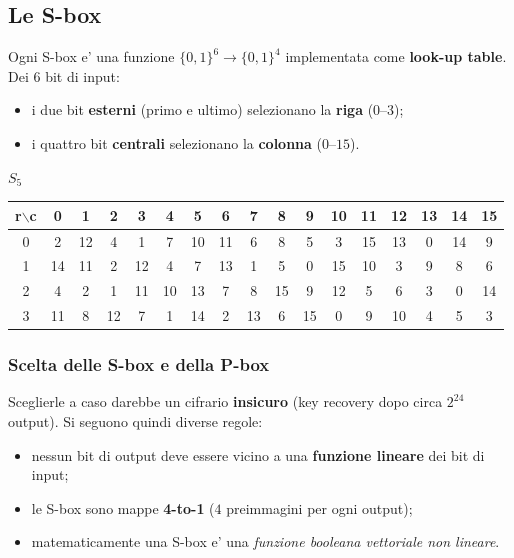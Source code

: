\subsection{Le S-box}
Ogni S-box e' una funzione $ \{0,1\}^6 \to \{0,1\}^4 $ implementata come \textbf{look-up table}. Dei $ 6 $ bit di input:
\begin{itemize}
  \item i due bit \textbf{esterni} (primo e ultimo) selezionano la \textbf{riga} ($ 0 $--$ 3 $);
  \item i quattro bit \textbf{centrali} selezionano la \textbf{colonna} ($ 0 $--$ 15 $).
\end{itemize}
\begin{center}
  \footnotesize
  \textbf{$S_5$}\\[2pt]
  \begin{tabular}{|c|*{16}{c|}}
    \hline
    \textbf{r$\backslash$c} & 0 & 1 & 2 & 3 & 4 & 5 & 6 & 7 & 8 & 9 & 10 & 11 & 12 & 13 & 14 & 15 \\ \hline
    0 & 2 & 12 & 4 & 1 & 7 & 10 & 11 & 6 & 8 & 5 & 3 & 15 & 13 & 0 & 14 & 9 \\ \hline
    1 & 14 & 11 & 2 & 12 & 4 & 7 & 13 & 1 & 5 & 0 & 15 & 10 & 3 & 9 & 8 & 6 \\ \hline
    2 & 4 & 2 & 1 & 11 & 10 & 13 & 7 & 8 & 15 & 9 & 12 & 5 & 6 & 3 & 0 & 14 \\ \hline
    3 & 11 & 8 & 12 & 7 & 1 & 14 & 2 & 13 & 6 & 15 & 0 & 9 & 10 & 4 & 5 & 3 \\ \hline
  \end{tabular}
\end{center}

\subsubsection{Scelta delle S-box e della P-box}
Sceglierle a caso darebbe un cifrario \textbf{insicuro} (key recovery dopo circa $ 2^{24} $ output). Si seguono quindi diverse regole:
\begin{itemize}
  \item nessun bit di output deve essere vicino a una \textbf{funzione lineare} dei bit di input;
  \item le S-box sono mappe \textbf{4-to-1} ($ 4 $ preimmagini per ogni output);
  \item matematicamente una S-box e' una \textit{funzione booleana vettoriale non lineare}.
\end{itemize}

